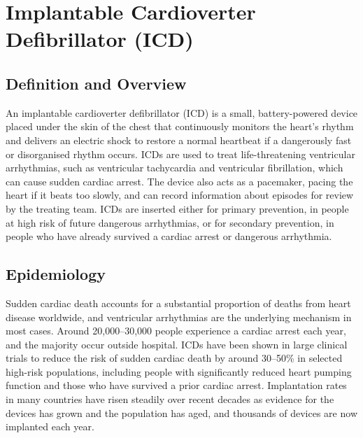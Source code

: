 \chapter{Implantable Cardioverter Defibrillator (ICD)}

\section*{Definition and Overview}
An implantable cardioverter defibrillator (ICD) is a small, battery-powered device placed under the skin of the chest that continuously monitors the heart's rhythm and delivers an electric shock to restore a normal heartbeat if a dangerously fast or disorganised rhythm occurs. ICDs are used to treat life-threatening ventricular arrhythmias, such as ventricular tachycardia and ventricular fibrillation, which can cause sudden cardiac arrest. The device also acts as a pacemaker, pacing the heart if it beats too slowly, and can record information about episodes for review by the treating team. ICDs are inserted either for primary prevention, in people at high risk of future dangerous arrhythmias, or for secondary prevention, in people who have already survived a cardiac arrest or dangerous arrhythmia.

\section*{Epidemiology}
Sudden cardiac death accounts for a substantial proportion of deaths from heart disease worldwide, and ventricular arrhythmias are the underlying mechanism in most cases. Around 20,000--30,000 people experience a cardiac arrest each year, and the majority occur outside hospital. ICDs have been shown in large clinical trials to reduce the risk of sudden cardiac death by around 30--50\% in selected high-risk populations, including people with significantly reduced heart pumping function and those who have survived a prior cardiac arrest. Implantation rates in many countries have risen steadily over recent decades as evidence for the devices has grown and the population has aged, and thousands of devices are now implanted each year.

